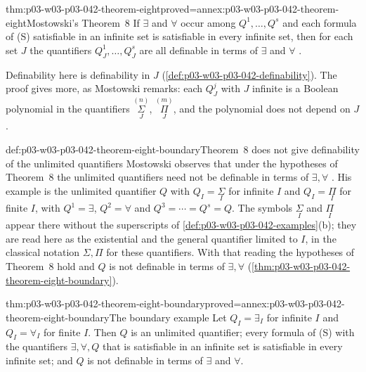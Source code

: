 \begin{hbtheorem}{thm:p03-w03-p03-042-theorem-eight}{proved=annex:p03-w03-p03-042-theorem-eight}{Mostowski's Theorem~8}
If \(\exists\) and \(\forall\) occur among \(Q^1,\ldots,Q^s\) and each
formula of (S) satisfiable in an infinite set is satisfiable in every
infinite set, then for each set \(J\) the quantifiers
\(Q^1_J,\ldots,Q^s_J\) are all definable in terms of \(\exists\) and
\(\forall\) \cite[p.~26]{Mostowski1957}.
\end{hbtheorem}

Definability here is definability in \(J\)
(\cref{def:p03-w03-p03-042-definability}).  The proof gives more, as
Mostowski remarks: each \(Q^j_J\) with \(J\) infinite is a Boolean
polynomial in the quantifiers \(\overset{(n)}{\underset J\Sigma}\),
\(\overset{(m)}{\underset J\Pi}\), and the polynomial does not depend on
\(J\) \cite[p.~27]{Mostowski1957}.

\begin{hbexample}{def:p03-w03-p03-042-theorem-eight-boundary}{Theorem~8 does not give definability of the unlimited quantifiers}
Mostowski observes that under the hypotheses of Theorem~8 the unlimited
quantifiers need not be definable in terms of \(\exists,\forall\)
\cite[p.~27]{Mostowski1957}.  His example is the unlimited quantifier
\(Q\) with \(Q_I=\underset I\Sigma\) for infinite \(I\) and
\(Q_I=\underset I\Pi\) for finite \(I\), with \(Q^1=\exists\),
\(Q^2=\forall\) and \(Q^3=\cdots=Q^s=Q\).  The symbols
\(\underset I\Sigma\) and \(\underset I\Pi\) appear there without the
superscripts of \cref{def:p03-w03-p03-042-examples}(b); they are read here
as the existential and the general quantifier limited to \(I\), in the
classical notation \(\Sigma,\Pi\) for these quantifiers.  With that
reading the hypotheses of Theorem~8 hold and \(Q\) is not definable in
terms of \(\exists,\forall\)
(\cref{thm:p03-w03-p03-042-theorem-eight-boundary}).
\end{hbexample}

\begin{hbtheorem}{thm:p03-w03-p03-042-theorem-eight-boundary}{proved=annex:p03-w03-p03-042-theorem-eight-boundary}{The boundary example}
Let \(Q_I=\exists_I\) for infinite \(I\) and \(Q_I=\forall_I\) for finite
\(I\).  Then \(Q\) is an unlimited quantifier; every formula of (S) with
the quantifiers \(\exists,\forall,Q\) that is satisfiable in an infinite
set is satisfiable in every infinite set; and \(Q\) is not definable in
terms of \(\exists\) and \(\forall\).
\end{hbtheorem}

